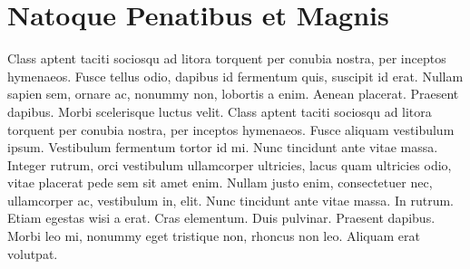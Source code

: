 \section{Natoque Penatibus et Magnis}
Class aptent taciti sociosqu ad litora torquent per conubia nostra, per inceptos hymenaeos. Fusce tellus odio, dapibus id fermentum quis, suscipit id erat. Nullam sapien sem, ornare ac, nonummy non, lobortis a enim. Aenean placerat. Praesent dapibus. Morbi scelerisque luctus velit. Class aptent taciti sociosqu ad litora torquent per conubia nostra, per inceptos hymenaeos. Fusce aliquam vestibulum ipsum. Vestibulum fermentum tortor id mi. Nunc tincidunt ante vitae massa. Integer rutrum, orci vestibulum ullamcorper ultricies, lacus quam ultricies odio, vitae placerat pede sem sit amet enim. Nullam justo enim, consectetuer nec, ullamcorper ac, vestibulum in, elit. Nunc tincidunt ante vitae massa. In rutrum. Etiam egestas wisi a erat. Cras elementum. Duis pulvinar. Praesent dapibus. Morbi leo mi, nonummy eget tristique non, rhoncus non leo. Aliquam erat volutpat.

\begin{table}
	\centering
	\caption{An example of two very small tables grouped together}
	\label{tab:TopLevelTableLabel}
	\hspace{3em} %
\end{table}

